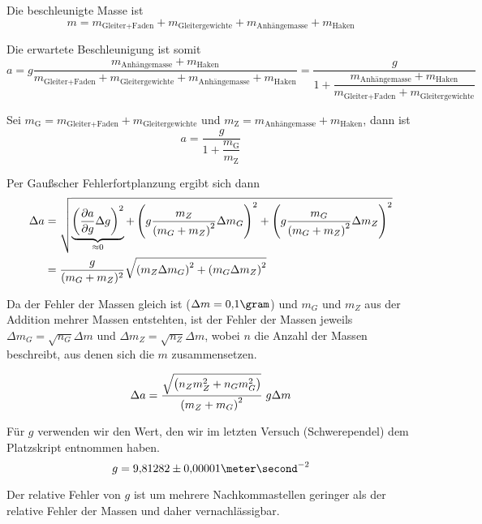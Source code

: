 \documentclass[a4paper,german,12pt,smallheadings]{scrartcl}
\begin{document}
Die beschleunigte Masse ist
\begin{equation}
  m = m_\text{Gleiter+Faden} + m_\text{Gleitergewichte} + m_\text{Anhängemasse} + m_\text{Haken}
\end{equation}

Die erwartete Beschleunigung ist somit
\begin{equation}
  a = g \frac{m_\text{Anhängemasse} + m_\text{Haken}}{m_\text{Gleiter+Faden} + m_\text{Gleitergewichte} + m_\text{Anhängemasse} + m_\text{Haken}} =
  \frac{g}{1 + \dfrac{m_\text{Anhängemasse} + m_\text{Haken}}{{m_\text{Gleiter+Faden} + m_\text{Gleitergewichte}}}}
\end{equation}

Sei $m_\text{G} = m_\text{Gleiter+Faden} + m_\text{Gleitergewichte}$ und $m_\text{Z} = m_\text{Anhängemasse} + m_\text{Haken}$, dann ist
\begin{equation}
  a = \frac{g}{1 + \dfrac{m_\text{G}}{m_\text{Z}}}
\end{equation}

Per Gaußscher Fehlerfortplanzung ergibt sich dann
\begin{align}
  \Delta a &= \sqrt{
    \underbrace{\del{\frac{\partial a}{\partial g} \Delta g}^2}_{\approx 0} +
    \del{
      g \frac{m_Z}{\del{m_G + m_Z}^2} \Delta m_G
    }^2
    +
    \del{
      g \frac{m_G}{\del{m_G + m_Z}^2} \Delta m_Z
    }^2
  } \\
  &= \frac{g}{(m_G + m_Z)^2} \sqrt{\del{m_Z \Delta m_G}^2 + \del{m_G \Delta m_Z}^2}
\end{align}

Da der Fehler der Massen gleich ist ($\Delta m = 0{,}1 \gram$) und $m_G$ und
$m_Z$ aus der Addition mehrer Massen entstehten, ist der Fehler der Massen
jeweils $\Delta m_G = \sqrt{n_G} \Delta m$ und $\Delta m_Z = \sqrt{n_Z} \Delta
m$, wobei $n$ die Anzahl der Massen beschreibt, aus denen sich die $m$
zusammensetzen.

\begin{equation}
  \Delta a = \frac{\sqrt{\del{n_Z m_Z^2 + n_G m_G^2}}}{\del{m_Z + m_G}^2} \; g \Delta m
\end{equation}

Für $g$ verwenden wir den Wert, den wir im letzten Versuch (Schwerependel) dem
Platzskript entnommen haben.
\begin{equation}
  g = 9{,}81282\pm0{,}00001 \meter\second^{-2}
\end{equation}

Der relative Fehler von $g$ ist um mehrere Nachkommastellen geringer als der
relative Fehler der Massen und daher vernachlässigbar.
\end{document}
